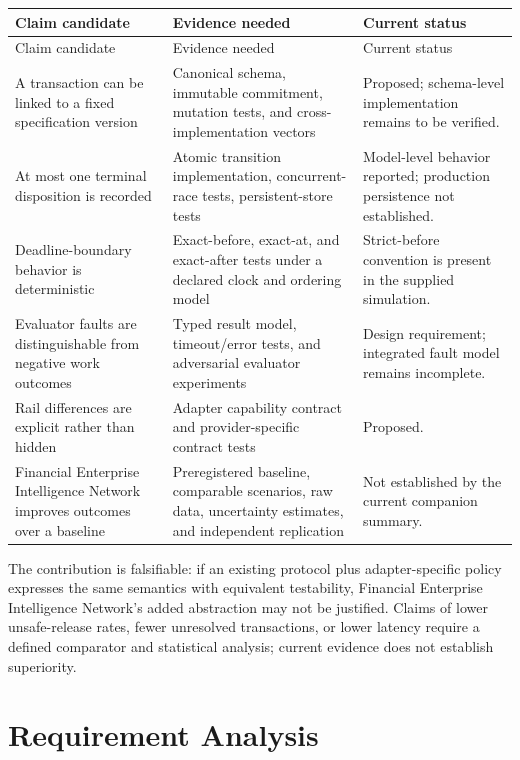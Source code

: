 \documentclass[12pt,a4paper,oneside]{report}
\begin{document}
\begin{longtable}{>{\raggedright\arraybackslash}p{}>{\raggedright\arraybackslash}p{}>{\raggedright\arraybackslash}p{}}
\toprule
Claim candidate & Evidence needed & Current status \\
\midrule
\endfirsthead
\toprule Claim candidate & Evidence needed & Current status \\
\midrule
\endhead
A transaction can be linked to a fixed specification version & Canonical schema, immutable commitment, mutation tests, and cross-implementation vectors & Proposed; schema-level implementation remains to be verified. \\
At most one terminal disposition is recorded & Atomic transition implementation, concurrent-race tests, persistent-store tests & Model-level behavior reported; production persistence not established. \\
Deadline-boundary behavior is deterministic & Exact-before, exact-at, and exact-after tests under a declared clock and ordering model & Strict-before convention is present in the supplied simulation. \\
Evaluator faults are distinguishable from negative work outcomes & Typed result model, timeout/error tests, and adversarial evaluator experiments & Design requirement; integrated fault model remains incomplete. \\
Rail differences are explicit rather than hidden & Adapter capability contract and provider-specific contract tests & Proposed. \\
Financial Enterprise Intelligence Network improves outcomes over a baseline & Preregistered baseline, comparable scenarios, raw data, uncertainty estimates, and independent replication & Not established by the current companion summary. \\
\bottomrule
\end{longtable}

The contribution is falsifiable: if an existing protocol plus adapter-specific policy expresses the same semantics with equivalent testability, Financial Enterprise Intelligence Network’s added abstraction may not be justified. Claims of lower unsafe-release rates, fewer unresolved transactions, or lower latency require a defined comparator and statistical analysis; current evidence does not establish superiority.

\chapter{Requirement Analysis}
\end{document}
